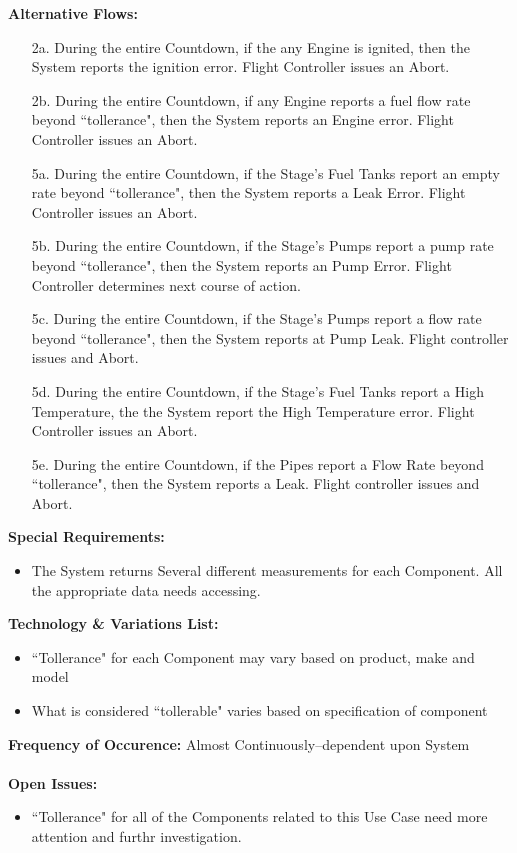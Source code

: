 \documentclass[letterpaper]{article}
\begin{document}
\textbf{Alternative Flows:}
\begin{itemize}
\item[2a.]During the entire Countdown, if the any Engine is ignited,
then the System reports the ignition error.  Flight Controller
issues an Abort.
\item[2b.]During the entire Countdown, if any Engine reports a fuel
flow rate beyond ``tollerance", then the System reports an Engine
error.  Flight Controller issues an Abort.
\item[5a.]During the entire Countdown, if the Stage's Fuel Tanks
report an empty rate beyond ``tollerance", then the System reports a
Leak Error.  Flight Controller issues an Abort.
\item[5b.]During the entire Countdown, if the Stage's Pumps report a
pump rate beyond ``tollerance", then the System reports an Pump Error.
Flight Controller determines next course of action.
\item[5c.]During the entire Countdown, if the Stage's Pumps report a
flow rate beyond ``tollerance", then the System reports at Pump Leak.
Flight controller issues and Abort.
\item[5d.]During the entire Countdown, if the Stage's Fuel Tanks
 report a High Temperature, the the System report the High Temperature
 error.  Flight Controller issues an Abort.
\item[5e.]During the entire Countdown, if the Pipes report a Flow Rate
 beyond ``tollerance", then the System reports a Leak.  Flight
 controller issues and Abort.
\end{itemize}
\textbf{Special Requirements:  }
\begin{itemize}
\item The System returns Several different measurements for each
Component.  All the appropriate data needs accessing.
\end{itemize}
\textbf{Technology \& Variations List:}
\begin{itemize}
\item ``Tollerance" for each Component may vary based on product, make
and model
\item What is considered ``tollerable" varies based on specification
of component
\end{itemize}
\textbf{Frequency of Occurence:  }Almost Continuously--dependent upon
System\\\\
\textbf{Open Issues:}
\begin{itemize}
\item ``Tollerance" for all of the Components related to this Use Case
need more attention and furthr investigation.
\end{itemize}
\end{document}
